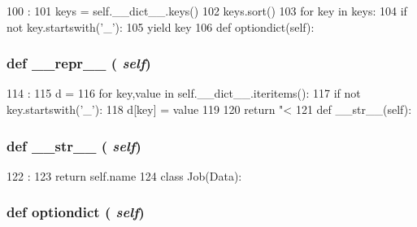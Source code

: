 \begin{DoxyCode}
100                       :
101         keys = self.__dict__.keys()
102         keys.sort()
103         for key in keys:
104             if not key.startswith('_'):
105                 yield key
106 
    def optiondict(self):
\end{DoxyCode}
\hypertarget{classm5_1_1util_1_1jobfile_1_1Data_ad8b9328939df072e4740cd9a63189744}{
\subsubsection[{\_\-\_\-repr\_\-\_\-}]{\setlength{\rightskip}{0pt plus 5cm}def \_\-\_\-repr\_\-\_\- ( {\em self})}}
\label{classm5_1_1util_1_1jobfile_1_1Data_ad8b9328939df072e4740cd9a63189744}



\begin{DoxyCode}
114                       :
115         d = {}
116         for key,value in self.__dict__.iteritems():
117             if not key.startswith('_'):
118                 d[key] = value
119 
120         return "<%
121 
    def __str__(self):
\end{DoxyCode}
\hypertarget{classm5_1_1util_1_1jobfile_1_1Data_aa7a4b9bc0941308e362738503137460e}{
\subsubsection[{\_\-\_\-str\_\-\_\-}]{\setlength{\rightskip}{0pt plus 5cm}def \_\-\_\-str\_\-\_\- ( {\em self})}}
\label{classm5_1_1util_1_1jobfile_1_1Data_aa7a4b9bc0941308e362738503137460e}



\begin{DoxyCode}
122                      :
123         return self.name
124 
class Job(Data):
\end{DoxyCode}
\hypertarget{classm5_1_1util_1_1jobfile_1_1Data_af5dee8788a100a9aad357e9616a44276}{
\subsubsection[{optiondict}]{\setlength{\rightskip}{0pt plus 5cm}def optiondict ( {\em self})}}
\label{classm5_1_1util_1_1jobfile_1_1Data_af5dee8788a100a9aad357e9616a44276}



